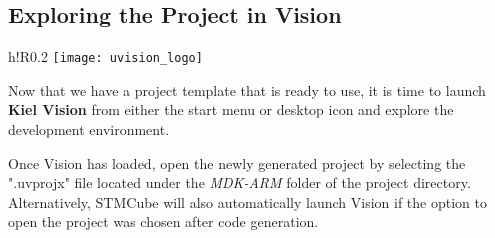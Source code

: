 \documentclass[openany,11pt,fleqn]{book} %
\begin{document}
%


\subsection{\color{orange}Exploring the Project in {\textmu}Vision}

    \begin{wrapfigure}[8]{h!R}{0.2\textwidth}
    \centering\texttt{[image: uvision\_logo]}
    \label{uvision_logo}
    \end{wrapfigure}

Now that we have a project template that is ready to use, it is time to launch \textbf{Kiel {\textmu}Vision} from either the start menu or desktop icon and explore the development environment. 

Once {\textmu}Vision has loaded, open the newly generated project by selecting the ".uvprojx" file located under the \textit{MDK-ARM} folder of the project directory. Alternatively, STMCube will also automatically launch {\textmu}Vision if the option to open the project was chosen after code generation. 
\end{document}
